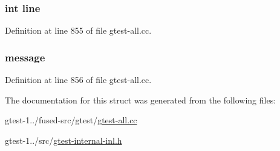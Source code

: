 \hypertarget{structtesting_1_1internal_1_1TraceInfo_a41ebd28ef1d7c6ade45642cb6acc1039}{
\subsubsection[{line}]{\setlength{\rightskip}{0pt plus 5cm}int {\bf line}}}\label{d9/d68/structtesting_1_1internal_1_1TraceInfo_a41ebd28ef1d7c6ade45642cb6acc1039}


\-Definition at line 855 of file gtest-\/all.\-cc.

\hypertarget{structtesting_1_1internal_1_1TraceInfo_a2836db0f8ae4563c70935b5e514bdc21}{
\subsubsection[{message}]{ {\bf message}}}\label{d9/d68/structtesting_1_1internal_1_1TraceInfo_a2836db0f8ae4563c70935b5e514bdc21}


\-Definition at line 856 of file gtest-\/all.\-cc.



\-The documentation for this struct was generated from the following files\-:\begin{DoxyCompactItemize}
\item 
gtest-\/1../fused-\/src/gtest/\hyperlink{fused-src_2gtest_2gtest-all_8cc}{gtest-\/all.\-cc}\item 
gtest-\/1../src/\hyperlink{gtest-internal-inl_8h}{gtest-\/internal-\/inl.\-h}\end{DoxyCompactItemize}
